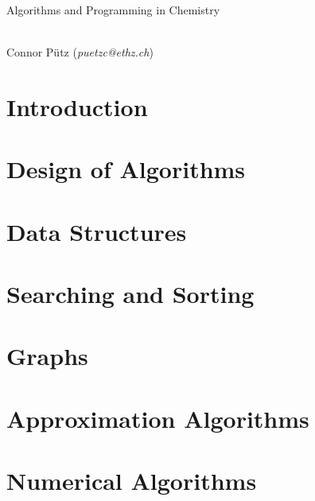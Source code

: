\documentclass[a4paper,11pt]{scrartcl}
\begin{document}
\thispagestyle{empty}

\begin{center}
\begin{LARGE}\sectfont
Algorithms and Programming in Chemistry
\end{LARGE}\\\vspace{0.5cm}
Connor Pütz (\textit{puetzc@ethz.ch})
\\\vspace{1cm}
\end{center}

\tableofcontents

\newpage\section{Introduction}

\newpage\section{Design of Algorithms}

\newpage\section{Data Structures}

\newpage\section{Searching and Sorting}

\newpage\section{Graphs}

\newpage\section{Approximation Algorithms}

\newpage\section{Numerical Algorithms}
\end{document}
